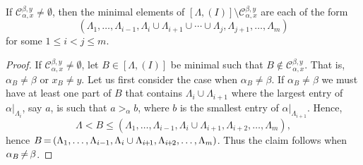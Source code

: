 \documentclass[ALCO,ThmDefs,Unicode,epreuves]{cedram}
\newcommand*{\Mk}{\mkern -2mu}
\begin{document}
\begin{lemma}\label{le:upperideal} If $ \mathcal{C}_{\alpha,x}^{\beta,y}\ne \emptyset$,
then the minimal elements of $[\Lambda,(I)]\setminus \mathcal{C}_{\alpha,x}^{\beta,y}$ are each of the form
 $$(\Lambda_1,\ldots,\Lambda_{i-1},\Lambda_i\cup\Lambda_{i+1}\cup\cdots\cup \Lambda_j,\Lambda_{j+1},\ldots,\Lambda_m)$$
for some $1\le i<j\le m$.
\end{lemma}
\begin{proof}
If $ \mathcal{C}_{\alpha,x}^{\beta,y}\ne\emptyset$, let $B\in [\Lambda,(I)]$ be minimal such that $B\notin \mathcal{C}_{\alpha,x}^{\beta,y}$.
That is, $\alpha_B\ne \beta$ or $x_B\ne y$. Let us first consider the case when $\alpha_B\ne \beta$. 
If $\alpha_B\ne \beta$ we must have at least one part of $B$ that contains $\Lambda_i\cup\Lambda_{i+1}$ where the largest entry of $\alpha|_{\Lambda_i}$, say $a$, is such that $a>_{\alpha}b$, where $b$ is the smallest entry of $\alpha|_{\Lambda_{i+1}}$. Hence, 
 $$\Lambda<B\le (\Lambda_1,\ldots,\Lambda_{i-1},\Lambda_i\cup\Lambda_{i+1},\Lambda_{i+2},\ldots,\Lambda_m),$$
hence $B\Mk = \Mk (\Lambda_1,\ldots,\Lambda_{i-1},\Lambda_i\cup\Lambda_{i\Mk +\Mk 1},\Lambda_{i\Mk +\Mk 2},\ldots,\Lambda_m)$. Thus the claim follows when $\alpha_B\Mk \neq\Mk \beta$. 



\end{proof}
\end{document}
